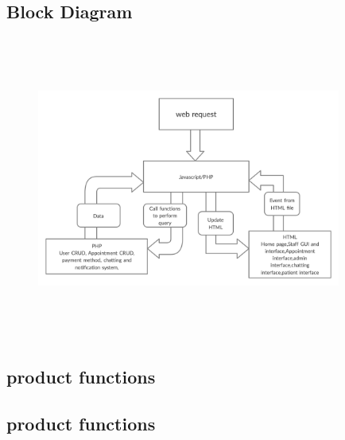 \documentclass[]{article}
\begin{document}
\subsection{Block Diagram}
\begin{figure}[h]
\centering
\includegraphics[width=10.0cm, height=10.0cm]{./clinic block diagram.png}
\label{label1}
\end{figure}
\FloatBarrier
\subsection{product functions}
\subsection{product functions}
\end{document}
